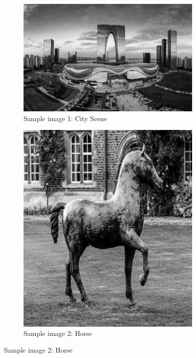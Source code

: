 \begin{figure}[H]
  \centering
  \begin{subfigure}[t]{0.4\textwidth}
    \includegraphics[width=\textwidth]{szzx_grey.jpg}
    \caption{Sample image 1: City Scene \cite{Zhao2017}}\label{fig:szzx_grey}
  \end{subfigure}
  \quad
  \begin{subfigure}[t]{0.219\textwidth}
    \includegraphics[width=\textwidth]{horse_grey.jpg}
    \caption{Sample image 2: Horse}\label{fig:horse_grey}
  \end{subfigure}


\end{figure}
